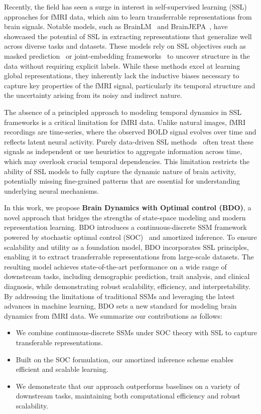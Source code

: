 \vspace{3mm}
Recently, the field has seen a surge in interest in self-supervised learning (SSL)~\cite{lecun2022path,he2022masked} approaches for fMRI data, which aim to learn transferrable representations from brain signals. Notable models, such as BrainLM~\citep{caro2024brainlm} and BrainJEPA~\citep{dong2024brain}, have showcased the potential of SSL in extracting representations that generalize well across diverse tasks and datasets. These models rely on SSL objectives such as masked prediction~\citep{he2022masked} or joint-embedding frameworks~\citep{assran2023self} to uncover structure in the data without requiring explicit labels. While these methods excel at learning global representations, they inherently lack the inductive biases necessary to capture key properties of the fMRI signal, particularly its temporal structure and the uncertainty arising from its noisy and indirect nature.

The absence of a principled approach to modeling temporal dynamics in SSL frameworks is a critical limitation for fMRI data. Unlike natural images, fMRI recordings are time-series, where the observed BOLD signal evolves over time and reflects latent neural activity. Purely data-driven SSL methods~\citep{caro2024brainlm, dong2024brain} often treat these signals as independent or use heuristics to aggregate information across time, which may overlook crucial temporal dependencies. This limitation restricts the ability of SSL models to fully capture the dynamic nature of brain activity, potentially missing fine-grained patterns that are essential for understanding underlying neural mechanisms.

In this work, we propose \textbf{Brain Dynamics with Optimal control (BDO)}, a novel approach that bridges the strengths of state-space modeling and modern representation learning. BDO introduces a continuous-discrete SSM framework powered by stochastic optimal control (SOC)~\citep{fleming2006controlled, carmona2016lectures} and amortized inference. To ensure scalability and utility as a foundation model, BDO incorporates SSL principles, enabling it to extract transferrable representations from large-scale datasets. The resulting model achieves state-of-the-art performance on a wide range of downstream tasks, including demographic prediction, trait analysis, and clinical diagnosis, while demonstrating robust scalability, efficiency, and interpretability. By addressing the limitations of traditional SSMs and leveraging the latest advances in machine learning, BDO sets a new standard for modeling brain dynamics from fMRI data. We summarize our contributions as follows:
\vspace{-2mm}
\begin{itemize}[leftmargin=10pt]
    \item We combine continuous-discrete SSMs under SOC theory with SSL to capture transferable representations.
    \item Built on the SOC formulation, our amortized inference scheme enables efficient and scalable learning.
    \item We demonstrate that our approach outperforms baselines on a variety of downstream tasks, maintaining both computational efficiency and robust scalability.
\end{itemize}
